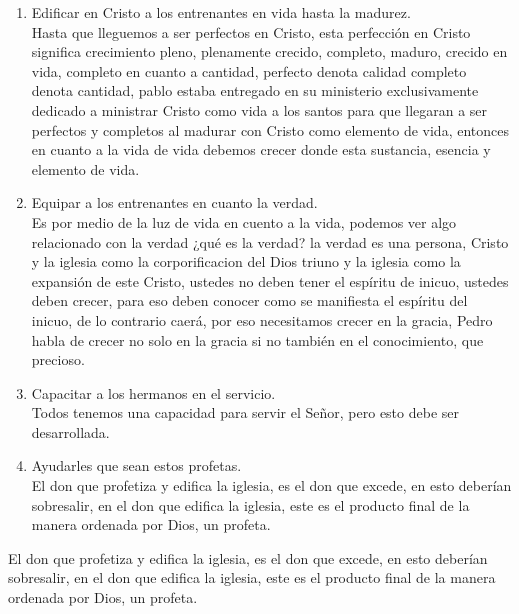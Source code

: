 \documentclass[12pt]{article}
\begin{document}
\begin{enumerate}
\item Edificar en Cristo a los entrenantes en vida hasta la madurez.\\

Hasta que lleguemos a ser perfectos en Cristo, esta perfección en Cristo significa crecimiento pleno, plenamente crecido, completo, maduro, crecido en vida, completo en cuanto a cantidad, perfecto denota calidad completo denota cantidad, pablo estaba entregado en su ministerio exclusivamente dedicado a ministrar Cristo como vida a los santos para que llegaran a ser perfectos y completos al madurar con Cristo como elemento de vida, entonces en cuanto a la vida de vida debemos crecer donde esta sustancia, esencia y elemento de vida. 


\item Equipar a los entrenantes en cuanto la verdad.\\
 
Es por medio de la luz de vida en cuento a la vida, podemos ver algo relacionado con la verdad ¿qué es la verdad? la verdad es una persona, Cristo y la iglesia como la corporificacion del Dios triuno y la iglesia como la expansión de este Cristo, ustedes no deben tener el espíritu de inicuo, ustedes deben crecer, para eso deben conocer como se manifiesta el espíritu del inicuo, de lo contrario caerá, por eso necesitamos crecer en la gracia, Pedro habla de crecer no solo en la gracia si  no también en el conocimiento, que precioso. 


\item Capacitar a los hermanos en el servicio. \\

Todos tenemos una capacidad para servir el Señor, pero esto debe ser desarrollada. 


\item Ayudarles que sean estos profetas.\\

El don que profetiza y edifica la iglesia, es el don que excede, en esto deberían sobresalir, en el don que edifica la iglesia, este es el producto final de la manera ordenada por Dios, un profeta.

\end{enumerate}

El don que profetiza y edifica la iglesia, es el don que excede, en esto deberían sobresalir, en el don que edifica la iglesia, este es el producto final de la manera ordenada por Dios, un profeta.\\
\end{document}
